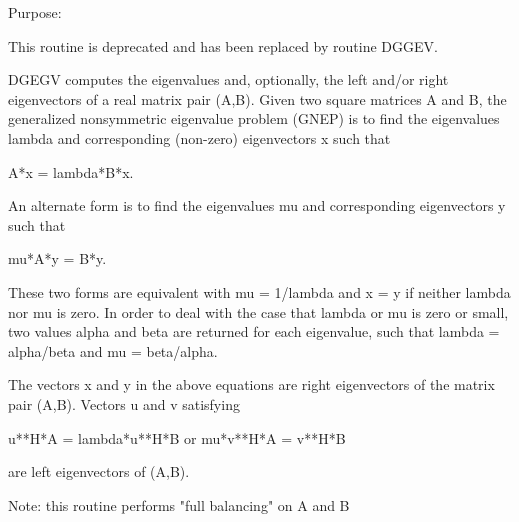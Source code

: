  \begin{DoxyParagraph}{Purpose\+: }
\begin{DoxyVerb} This routine is deprecated and has been replaced by routine DGGEV.

 DGEGV computes the eigenvalues and, optionally, the left and/or right
 eigenvectors of a real matrix pair (A,B).
 Given two square matrices A and B,
 the generalized nonsymmetric eigenvalue problem (GNEP) is to find the
 eigenvalues lambda and corresponding (non-zero) eigenvectors x such
 that

    A*x = lambda*B*x.

 An alternate form is to find the eigenvalues mu and corresponding
 eigenvectors y such that

    mu*A*y = B*y.

 These two forms are equivalent with mu = 1/lambda and x = y if
 neither lambda nor mu is zero.  In order to deal with the case that
 lambda or mu is zero or small, two values alpha and beta are returned
 for each eigenvalue, such that lambda = alpha/beta and
 mu = beta/alpha.

 The vectors x and y in the above equations are right eigenvectors of
 the matrix pair (A,B).  Vectors u and v satisfying

    u**H*A = lambda*u**H*B  or  mu*v**H*A = v**H*B

 are left eigenvectors of (A,B).

 Note: this routine performs "full balancing" on A and B\end{DoxyVerb}
 
\end{DoxyParagraph}

